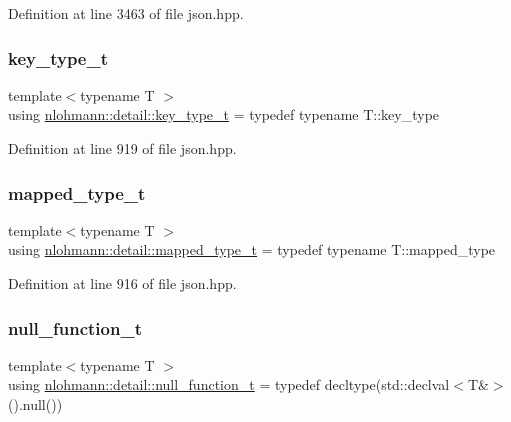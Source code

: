 Definition at line 3463 of file json.\+hpp.

\mbox{\label{namespacenlohmann_1_1detail_a66dfe39f03b05d6b7265a0ff748d64ef}} 
\subsubsection{\texorpdfstring{key\_type\_t}{key\_type\_t}}
{\footnotesize\ttfamily template$<$typename T $>$ \\
using \mbox{\hyperlink{namespacenlohmann_1_1detail_a66dfe39f03b05d6b7265a0ff748d64ef}{nlohmann\+::detail\+::key\+\_\+type\+\_\+t}} = typedef typename T\+::key\+\_\+type}



Definition at line 919 of file json.\+hpp.

\mbox{\label{namespacenlohmann_1_1detail_a9c1795c148875722f8482d39e0eb9364}} 
\subsubsection{\texorpdfstring{mapped\_type\_t}{mapped\_type\_t}}
{\footnotesize\ttfamily template$<$typename T $>$ \\
using \mbox{\hyperlink{namespacenlohmann_1_1detail_a9c1795c148875722f8482d39e0eb9364}{nlohmann\+::detail\+::mapped\+\_\+type\+\_\+t}} = typedef typename T\+::mapped\+\_\+type}



Definition at line 916 of file json.\+hpp.

\mbox{\label{namespacenlohmann_1_1detail_ac1b4e524746bf8b790b2b776048b93c4}} 
\subsubsection{\texorpdfstring{null\_function\_t}{null\_function\_t}}
{\footnotesize\ttfamily template$<$typename T $>$ \\
using \mbox{\hyperlink{namespacenlohmann_1_1detail_ac1b4e524746bf8b790b2b776048b93c4}{nlohmann\+::detail\+::null\+\_\+function\+\_\+t}} = typedef decltype(std\+::declval$<$T\&$>$().null())}



